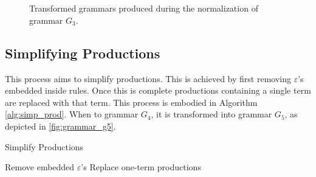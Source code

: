 \documentclass[10pt,nocc]{xrese_report}
\begin{document}
\begin{figure}[tb]
{\begin{minipage}[t]{.3\textwidth}
\begin{bnf*}
\\
\\
\end{bnf*}
 \end{minipage}
}
 \qquad
 \caption{Transformed grammars produced during the normalization of grammar $G_3$.}
\end{figure}

\subsection{Simplifying Productions}

This process aims to simplify productions. This is achieved by first removing $\varepsilon$'s embedded inside rules. Once this is complete productions containing a single term are replaced with that term. This process is embodied in Algorithm \ref{alg:simp_prod}. When to grammar $G_4$, it is transformed into grammar $G_5$, as depicted in \ref{fig:grammar_g5}.

\begin{algorithm}[tb]
\caption{Simplify Productions}\label{alg:simp_prod}
 \begin{algorithmic}[1]
    \LineComment Remove embedded $\varepsilon$'s
        \State {}
      \EndIf
    \EndFor
    \LineComment Replace one-term productions
        \State {}
      \EndIf
    \EndFor
  \EndFunction
 \end{algorithmic}
\end{algorithm}
\end{document}
